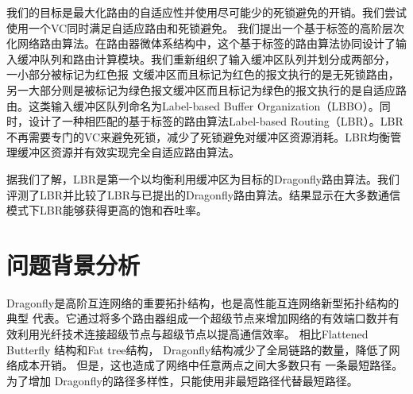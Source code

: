 我们的目标是最大化路由的自适应性并使用尽可能少的死锁避免的开销。我们尝试使用一个VC同时满足自适应路由和死锁避免。
我们提出一个基于标签的高阶层次化网络路由算法。在路由器微体系结构中，这个基于标签的路由算法协同设计了输入缓冲队列和路由计算模块。我们重新组织了输入缓冲区队列并划分成两部分，
一小部分被标记为红色报
文缓冲区而且标记为红色的报文执行的是无死锁路由，另一大部分则是被标记为绿色报文缓冲区而且标记为绿色的报文执行的是自适应路由。这类输入缓冲区队列命名为Label-based Buffer Organization（LBBO）。同时，设计了一种相匹配的基于标签的路由算法Label-based Routing（LBR）。LBR不再需要专门的VC来避免死锁，减少了死锁避免对缓冲区资源消耗。LBR均衡管理缓冲区资源并有效实现完全自适应路由算法。

据我们了解，LBR是第一个以均衡利用缓冲区为目标的Dragonfly路由算法。我们评测了LBR并比较了LBR与已提出的Dragonfly路由算法。结果显示在大多数通信模式下LBR能够获得更高的饱和吞吐率。

\section{问题背景分析}

Dragonfly是高阶互连网络的重要拓扑结构，也是高性能互连网络新型拓扑结构的典型
代表。它通过将多个路由器组成一个超级节点来增加网络的有效端口数并有效利用光纤技术连接超级节点与超级节点以提高通信效率。
相比Flattened Butterfly
结构和Fat tree结构，
Dragonfly结构减少了全局链路的数量，降低了网络成本开销。
但是，这也造成了网络中任意两点之间大多数只有
一条最短路径。为了增加
Dragonfly的路径多样性，只能使用非最短路径代替最短路径。

